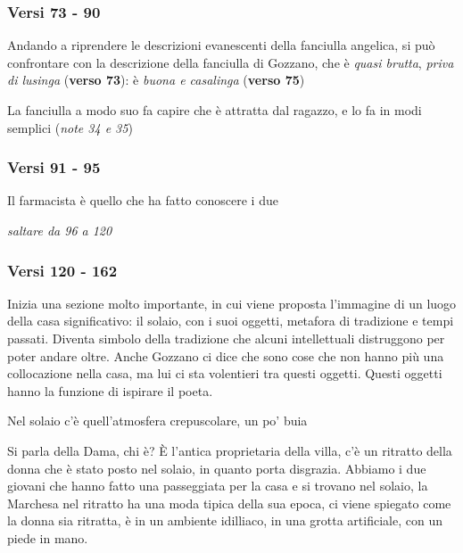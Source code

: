 \subsubsection{Versi 73 - 90}

Andando a riprendere le descrizioni evanescenti della fanciulla angelica, si può confrontare con la descrizione della fanciulla di Gozzano, che è \textit{quasi brutta}, \textit{priva di lusinga} (\textbf{verso 73}): è \textit{buona e casalinga} (\textbf{verso 75})

La fanciulla a modo suo fa capire che è attratta dal ragazzo, e lo fa in modi semplici (\emph{note 34 e 35})

\subsubsection{Versi 91 - 95}

Il farmacista è quello che ha fatto conoscere i due

\emph{saltare da 96 a 120}

\subsubsection{Versi 120 - 162}

Inizia una sezione molto importante, in cui viene proposta l’immagine di un luogo della casa significativo: il solaio, con i suoi oggetti, metafora di tradizione e tempi passati.
Diventa simbolo della tradizione che alcuni intellettuali distruggono per poter andare oltre. Anche Gozzano ci dice che sono cose che non hanno più una collocazione nella casa, ma lui ci sta volentieri tra questi oggetti.
Questi oggetti hanno la funzione di ispirare il poeta.

Nel solaio c’è quell’atmosfera crepuscolare, un po’ buia

Si parla della Dama, chi è? È l’antica proprietaria della villa, c’è un ritratto della donna che è stato posto nel solaio, in quanto porta disgrazia. Abbiamo i due giovani che hanno fatto una passeggiata per la casa e si trovano nel solaio, la Marchesa nel ritratto ha una moda tipica della sua epoca, ci viene spiegato come la donna sia ritratta, è in un ambiente idilliaco, in una grotta artificiale, con un piede in mano.

